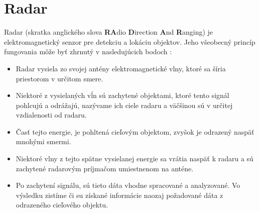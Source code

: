 \documentclass[slovak]{ExcelAtFIT} %
\begin{document}
\section{Radar}
\label{sec:Radar}
	\hspace{0.6cm}Radar (skratka anglického slova \textbf{RA}dio \textbf{D}irection \textbf{A}nd \textbf{R}anging) je elektromagnetický senzor pre detekciu a lokáciu objektov. Jeho všeobecný princíp fungovania môže byť zhrnutý v  nasledujúcich bodoch \cite{radartutor}\cite{radarhandbook}:
	\begin{itemize}
	\item Radar vysiela zo svojej antény elektromagnetické vlny, ktoré sa šíria priestorom v určitom smere.
	\item Niektoré z vysielaných vĺn sú zachytené objektami, ktoré tento signál pohlcujú a odrážajú, nazývame ich ciele radaru a väčšinou sú v určitej vzdialenosti od radaru.
	\item Časť tejto energie, je pohltená cieľovým objektom, zvyšok je odrazený naspäť mnohými smermi.
	\item Niektoré vlny z tejto spätne vysielanej energie sa vrátia naspäť k radaru a sú zachytené radarovým príjmačom umiestnenom na anténe.
	\item Po zachytení signálu, sú tieto dáta vhodne spracované a analyzované. Vo výsledku zistíme či su získané informácie naozaj požadované dáta z odrazeného cieľového objektu.
	\end{itemize}
\end{document}
